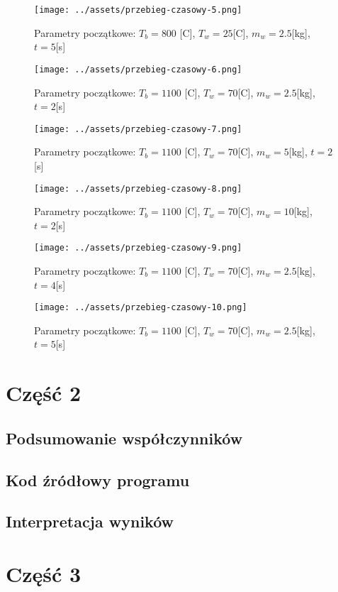 \documentclass[
	12pt, %
]{fphw}
\begin{document}
\begin{figure}[H]
	\texttt{[image: ../assets/przebieg-czasowy-5.png]}
	\caption{Parametry początkowe: \(T_b = 800\) [\textdegree{}C], \(T_w = 25\)[\textdegree{}C], \(m_w = 2.5\)[kg], \(t = 5\)[s]}

	\texttt{[image: ../assets/przebieg-czasowy-6.png]}
	\caption{Parametry początkowe: \(T_b = 1100\) [\textdegree{}C], \(T_w = 70\)[\textdegree{}C], \(m_w = 2.5\)[kg], \(t = 2\)[s]}
\end{figure}

\begin{figure}[H]
	\texttt{[image: ../assets/przebieg-czasowy-7.png]}
	\caption{Parametry początkowe: \(T_b = 1100\) [\textdegree{}C], \(T_w = 70\)[\textdegree{}C], \(m_w = 5\)[kg], \(t = 2\)[s]}

	\texttt{[image: ../assets/przebieg-czasowy-8.png]}
	\caption{Parametry początkowe: \(T_b = 1100\) [\textdegree{}C], \(T_w = 70\)[\textdegree{}C], \(m_w = 10\)[kg], \(t = 2\)[s]}
\end{figure}

\begin{figure}[H]
	\texttt{[image: ../assets/przebieg-czasowy-9.png]}
	\caption{Parametry początkowe: \(T_b = 1100\) [\textdegree{}C], \(T_w = 70\)[\textdegree{}C], \(m_w = 2.5\)[kg], \(t = 4\)[s]}

	\texttt{[image: ../assets/przebieg-czasowy-10.png]}
	\caption{Parametry początkowe: \(T_b = 1100\) [\textdegree{}C], \(T_w = 70\)[\textdegree{}C], \(m_w = 2.5\)[kg], \(t = 5\)[s]}
\end{figure}

\section{Część 2}
\subsection{Podsumowanie współczynników}
\subsection{Kod źródłowy programu}
\subsection{Interpretacja wyników}
\section{Część 3}
\end{document}
